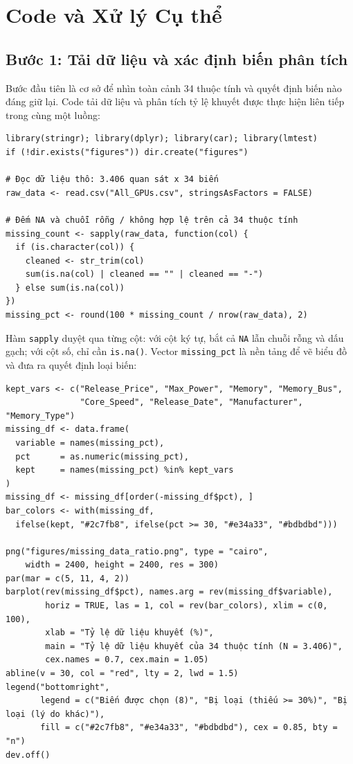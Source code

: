 \documentclass[a4paper]{article}
\begin{document}
\section{Code và Xử lý Cụ thể}

\subsection{Bước 1: Tải dữ liệu và xác định biến phân tích}
\label{sec:phan_tich_bien}

Bước đầu tiên là cơ sở để nhìn toàn cảnh 34 thuộc tính và quyết định biến nào đáng giữ lại. Code tải dữ liệu và phân tích tỷ lệ khuyết được thực hiện liên tiếp trong cùng một luồng:

\begin{verbatim}
library(stringr); library(dplyr); library(car); library(lmtest)
if (!dir.exists("figures")) dir.create("figures")

# Đọc dữ liệu thô: 3.406 quan sát x 34 biến
raw_data <- read.csv("All_GPUs.csv", stringsAsFactors = FALSE)

# Đếm NA và chuỗi rỗng / không hợp lệ trên cả 34 thuộc tính
missing_count <- sapply(raw_data, function(col) {
  if (is.character(col)) {
    cleaned <- str_trim(col)
    sum(is.na(col) | cleaned == "" | cleaned == "-")
  } else sum(is.na(col))
})
missing_pct <- round(100 * missing_count / nrow(raw_data), 2)
\end{verbatim}

Hàm \texttt{sapply} duyệt qua từng cột: với cột ký tự, bắt cả \texttt{NA} lẫn chuỗi rỗng và dấu gạch; với cột số, chỉ cần \texttt{is.na()}. Vector \texttt{missing\_pct} là nền tảng để vẽ biểu đồ và đưa ra quyết định loại biến:

\begin{verbatim}
kept_vars <- c("Release_Price", "Max_Power", "Memory", "Memory_Bus",
               "Core_Speed", "Release_Date", "Manufacturer", "Memory_Type")
missing_df <- data.frame(
  variable = names(missing_pct),
  pct      = as.numeric(missing_pct),
  kept     = names(missing_pct) %in% kept_vars
)
missing_df <- missing_df[order(-missing_df$pct), ]
bar_colors <- with(missing_df,
  ifelse(kept, "#2c7fb8", ifelse(pct >= 30, "#e34a33", "#bdbdbd")))

png("figures/missing_data_ratio.png", type = "cairo",
    width = 2400, height = 2400, res = 300)
par(mar = c(5, 11, 4, 2))
barplot(rev(missing_df$pct), names.arg = rev(missing_df$variable),
        horiz = TRUE, las = 1, col = rev(bar_colors), xlim = c(0, 100),
        xlab = "Tỷ lệ dữ liệu khuyết (%)",
        main = "Tỷ lệ dữ liệu khuyết của 34 thuộc tính (N = 3.406)",
        cex.names = 0.7, cex.main = 1.05)
abline(v = 30, col = "red", lty = 2, lwd = 1.5)
legend("bottomright",
       legend = c("Biến được chọn (8)", "Bị loại (thiếu >= 30%)", "Bị loại (lý do khác)"),
       fill = c("#2c7fb8", "#e34a33", "#bdbdbd"), cex = 0.85, bty = "n")
dev.off()
\end{verbatim}
\end{document}
